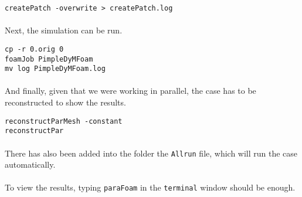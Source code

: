 \begin{center}
\texttt{createPatch -overwrite > createPatch.log}
\end{center}

\paragraph{}Next, the simulation can be run.

\begin{center}
\texttt{cp -r 0.orig 0\\
foamJob PimpleDyMFoam\\
mv log PimpleDyMFoam.log}
\end{center}

\paragraph{}And finally, given that we were working in parallel, the case has to be reconstructed to show the results.

\begin{center}
\texttt{reconstructParMesh -constant\\
reconstructPar}
\end{center}

\paragraph{}There has also been added into the folder the \texttt{Allrun} file, which will run the case automatically.

\paragraph{}To view the results, typing \texttt{paraFoam} in the \texttt{terminal} window should be enough.